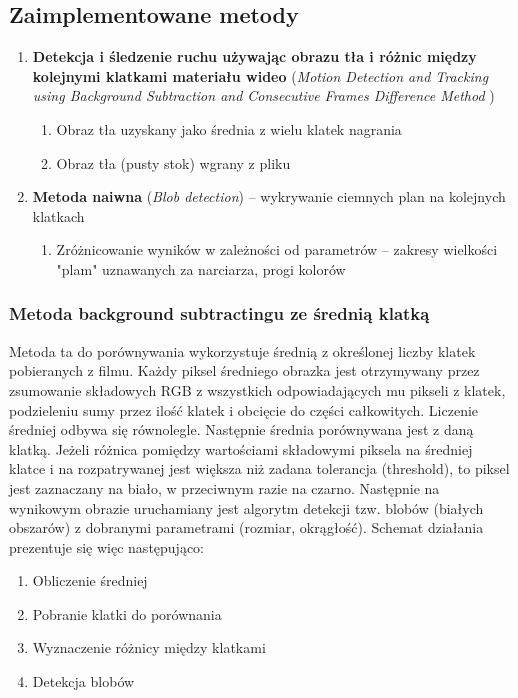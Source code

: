 \documentclass[a4paper]{article}
\begin{document}
\subsection{Zaimplementowane metody}
\label{sec:Methods}
\begin{enumerate}
\item \textbf{Detekcja i śledzenie ruchu używając obrazu tła i różnic między kolejnymi klatkami materiału wideo} (\textit{Motion Detection and Tracking using Background Subtraction and Consecutive Frames Difference Method} \cite{1})
	\begin{enumerate}
	\item Obraz tła uzyskany jako średnia z wielu klatek nagrania
	\item Obraz tła (pusty stok) wgrany z pliku
	\end{enumerate}
\item \textbf{Metoda naiwna} (\textit{Blob detection}) – wykrywanie ciemnych plan na kolejnych klatkach
	\begin{enumerate}
	\item Zróżnicowanie wyników w zależności od parametrów – zakresy wielkości "plam" uznawanych za narciarza, progi kolorów
	\end{enumerate}
\end{enumerate}	

\subsubsection{Metoda background subtractingu ze średnią klatką}
Metoda ta do porównywania wykorzystuje średnią z określonej liczby klatek pobieranych z filmu. Każdy piksel średniego obrazka jest otrzymywany przez zsumowanie składowych RGB z wszystkich odpowiadających mu pikseli z klatek, podzieleniu sumy przez ilość klatek i obcięcie do części całkowitych. Liczenie średniej odbywa się równolegle. Następnie średnia porównywana jest z daną klatką. Jeżeli różnica pomiędzy wartościami składowymi piksela na średniej klatce i na rozpatrywanej jest większa niż zadana tolerancja (threshold), to piksel jest zaznaczany na biało, w przeciwnym razie na czarno. Następnie na wynikowym obrazie uruchamiany jest algorytm detekcji tzw. blobów (białych obszarów) z dobranymi parametrami (rozmiar, okrągłość).
Schemat działania prezentuje się więc następująco:
\begin{enumerate}
\item Obliczenie średniej
\item Pobranie klatki do porównania
\item Wyznaczenie różnicy między klatkami
\item Detekcja blobów
\end{enumerate}
\end{document}
